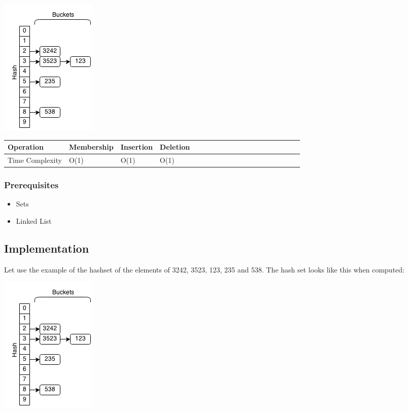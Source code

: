 \documentclass[11pt,oneside]{book}
\makeatletter
\def\maxwidth#1{\ifdim\Gin@nat@width>#1 #1\else\Gin@nat@width\fi}
\makeatother
\begin{document}
\includegraphics[width=\maxwidth{\textwidth}]{hashset.png}

\vspace{10pt} \begin{tabular}{|l|l|l|l|l|l|l|l|l|l|l|l|l|l|l|l|l|l|l}\hline


  Operation &
  Membership &
  Insertion &
  Deletion\\
\hline


  Time Complexity &
  O(1) &
  O(1) &
  O(1)\\

\hline\end{tabular}

\subsubsection{Prerequisites}

\begin{itemize}
\item Sets
\item Linked List
\end{itemize}

\subsection{Implementation}

Let use the example of the hashset of the elements of 3242, 3523, 123, 235 and 538. The hash set looks like this when computed:

\includegraphics[width=\maxwidth{\textwidth}]{hashset.png}
\end{document}
